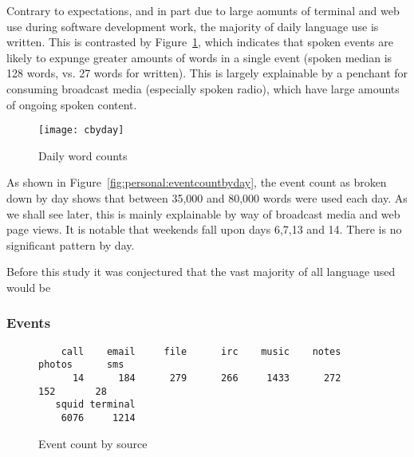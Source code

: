 Contrary to expectations, and in part due to large aomunts of terminal and web use during software development work, the majority of daily language use is written.  This is contrasted by Figure~\ref{fig:personal:wordcountbyday}, which indicates that spoken events are likely to expunge greater amounts of words in a single event (spoken median is 128 words, vs. 27 words for written).  This is largely explainable by a penchant for consuming broadcast media (especially spoken radio), which have large amounts of ongoing spoken content.

% 


\begin{figure}[p]
\centering
\texttt{[image: cbyday]}
\caption{Daily word counts}
\label{fig:personal:wordcountbyday}
\end{figure}

As shown in Figure~\ref{fig:personal:eventcountbyday}, the event count as broken down by day shows that between 35,000 and 80,000 words were used each day.  As we shall see later, this is mainly explainable by way of broadcast media and web page views.  It is notable that weekends fall upon days 6,7,13 and 14.  There is no significant pattern by day.

Before this study it was conjectured that the vast majority of all language used would be 








\subsubsection{Events}

\begin{figure}[p]
\centering
\begin{verbatim}
    call    email     file      irc    music    notes   photos      sms 
      14      184      279      266     1433      272      152       28 
   squid terminal 
    6076     1214 
\end{verbatim}
\caption{Event count by source}
\label{fig:personal:eventsbysource}
\end{figure}

